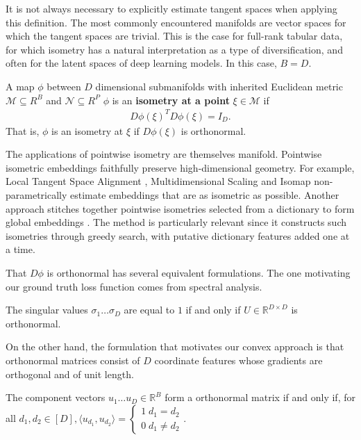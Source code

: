 It is not always necessary to explicitly estimate tangent spaces when applying this definition.
The most commonly encountered manifolds are vector spaces for which the tangent spaces are trivial.
This is the case for full-rank tabular data, for which isometry has a natural interpretation as a type of diversification, and often for the latent spaces of deep learning models.
In this case, $B = D$.

\begin{definition}
\label{def:isometric_at_a_point}
A map $\phi$ between $D$ dimensional submanifolds with inherited Euclidean metric $\mathcal M \subseteq R^{B}$ and $\mathcal N  \subseteq R^{P}$
$\phi$ is an \textbf{isometry at a point} $\xi \in \mathcal M$ if
\begin{align}
{D \phi (\xi)}^T D \phi (\xi) = I_D.
\end{align}
That is, $\phi$ is an isometry at $\xi$ if $D \phi (\xi)$ is orthonormal.
\end{definition}

The applications of pointwise isometry are themselves manifold.
Pointwise isometric embeddings faithfully preserve high-dimensional geometry.
For example, Local Tangent Space Alignment \citep{ZhangZ:04}, Multidimensional Scaling \citep{ChenBuja:localMDS09} and Isomap \citep{tenenbaum2000ggf} non-parametrically estimate embeddings that are as isometric as possible.
Another approach stitches together pointwise isometries selected from a dictionary to form global embeddings \citep{Kohli2021-lr}.
The method is particularly relevant since it constructs such isometries through greedy search, with putative dictionary features added one at a time.

That $D\phi$ is orthonormal has several equivalent formulations.
The one motivating our ground truth loss function comes from spectral analysis.
\begin{proposition}
\label{prop:orthonormal_spectrum}
The singular values $\sigma_1 \dots \sigma_D$ are equal to $1$ if and only if $U \in \mathbb{R}^{D \times D}$ is orthonormal.
\end{proposition}
On the other hand, the formulation that motivates our convex approach is that orthonormal matrices consist of $D$ coordinate features whose gradients are orthogonal and of unit length.
\begin{proposition}
\label{prop:orthonormal_basis}
The component vectors $u_1 \dots u_D \in \mathbb R^B$ form a orthonormal matrix if and only if, for all $d_1, d_2 \in [D], \langle u_{d_1}, u_{d_2} \rangle = \begin{cases}
1 \; d_1 = d_2 \\ 
0 \; d_1 \neq d_2 
\end{cases}$.
\end{proposition}

